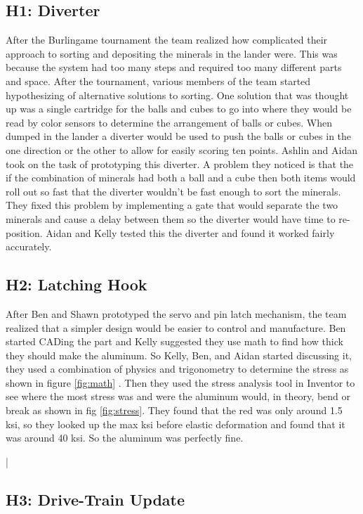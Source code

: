 \documentclass{article}
\begin{document}
{\subsection{H1: Diverter}

After the Burlingame tournament the team realized how complicated their approach to sorting and depositing the minerals in the lander were. This was because the system had too many steps and required too many different parts and space. After the tournament, various members of the team started hypothesizing of alternative solutions to sorting. One solution that was thought up was a single cartridge for the balls and cubes to go into where they would be read by color sensors to determine the arrangement of balls or cubes. When dumped in the lander a diverter would be used to push the balls or cubes in the one direction or the other to allow for easily scoring ten points. Ashlin and Aidan took on the task of prototyping this diverter. A problem they noticed is that the if the combination of minerals had both a ball and a cube then both items would roll out so fast that the diverter wouldn't be fast enough to sort the minerals. They fixed this problem by implementing a gate that would separate the two minerals and cause a delay between them so the diverter would have time to re-position. Aidan and Kelly tested this the diverter and found it worked fairly accurately.

\subsection{H2: Latching Hook}

After Ben and Shawn prototyped the servo and pin latch mechanism, the team realized that a simpler design would be easier to control and manufacture. Ben started CADing the part and Kelly suggested they use math to find how thick they should make the aluminum. So Kelly, Ben, and Aidan started discussing it, they used a combination of physics and trigonometry to determine the stress as shown in figure \ref{fig:math} . Then they used the stress analysis tool in Inventor to see where the most stress was and were the aluminum would, in theory, bend or break as shown in fig \ref{fig:stress}. They found that the red was only around 1.5 ksi, so they looked up the max ksi before elastic deformation and found that it was around 40 ksi. So the aluminum was perfectly fine.

|\subsection{H3: Drive-Train Update}

}
\end{document}
